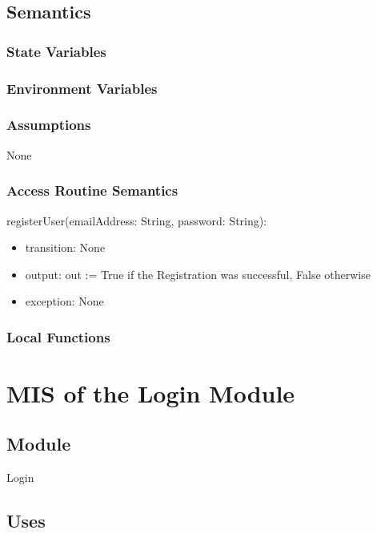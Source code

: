 \documentclass[12pt, titlepage]{article}
\begin{document}
\subsection{Semantics}

\subsubsection{State Variables}

\subsubsection{Environment Variables}

\subsubsection{Assumptions}

None

\subsubsection{Access Routine Semantics}

\noindent registerUser(emailAddress: String, password: String):
\begin{itemize}
\item transition: None
\item output: out := True if the Registration was successful, False otherwise
\item exception: None
\end{itemize}

\subsubsection{Local Functions}

\section{MIS of the Login Module} \label{Login}

\subsection{Module}

Login

\subsection{Uses}
\end{document}
